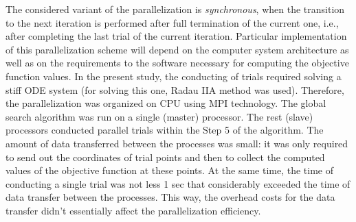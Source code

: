 \documentclass{svproc}
\begin{document}
The considered variant of the parallelization is \textit{synchronous}, when the transition to the next iteration is performed after full termination of the current one, i.e., after completing the last trial of the current iteration.
Particular implementation of this parallelization scheme will depend on the computer system architecture as well as on the requirements to the software necessary for computing the objective function values. In the present study, the conducting of trials required solving a stiff ODE system (for solving this one, Radau IIA method was used). Therefore, the parallelization was organized on CPU using MPI technology. The global search algorithm was run on a single (master) processor. The rest (slave) processors conducted parallel trials within the Step 5 of the algorithm. The amount of data transferred between the processes was small: it was only required to send out the coordinates of trial points and then to collect the computed values of the objective function at these points. At the same time, the time of conducting a single trial was not less 1 sec that considerably exceeded the time of data transfer between the processes. This way, the overhead costs for the data transfer didn't essentially affect the parallelization efficiency.

\end{document}
